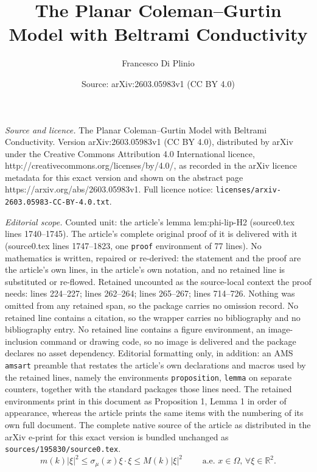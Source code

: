 \documentclass[10pt,a4paper]{amsart}
\title{The Planar Coleman--Gurtin Model with Beltrami Conductivity}
\author{Francesco Di Plinio}
\date{Source: arXiv:2603.05983v1 (CC BY 4.0)}
\begin{document}
\maketitle

\noindent\emph{Source and licence.} The Planar Coleman--Gurtin Model with Beltrami Conductivity. Version arXiv:2603.05983v1 (CC BY 4.0), distributed by arXiv under the Creative Commons Attribution 4.0 International licence, http://creativecommons.org/licenses/by/4.0/, as recorded in the arXiv licence metadata for this exact version and shown on the abstract page https://arxiv.org/abs/2603.05983v1. Full licence notice: \texttt{licenses/arxiv-2603.05983-CC-BY-4.0.txt}.\par\smallskip

\noindent\textit{Editorial scope.} Counted unit: the article's lemma lem:phi-lip-H2 (source0.tex lines 1740--1745). The article's complete original proof of it is delivered with it (source0.tex lines 1747--1823, one \texttt{proof} environment of 77 lines). No mathematics is written, repaired or re-derived: the statement and the proof are the article's own lines, in the article's own notation, and no retained line is substituted or re-flowed.  Retained uncounted as the source-local context the proof needs: lines 224--227; lines 262--264; lines 265--267; lines 714--726.  Nothing was omitted from any retained span, so the package carries no omission record.  No retained line contains a citation, so the wrapper carries no bibliography and no bibliography entry.  No retained line contains a figure environment, an image-inclusion command or drawing code, so no image is delivered and the package declares no asset dependency.  Editorial formatting only, in addition: an AMS \texttt{amsart} preamble that restates the article's own declarations and macros used by the retained lines, namely the environments \texttt{proposition}, \texttt{lemma} on separate counters, together with the standard packages those lines need.  The retained environments print in this document as Proposition 1, Lemma 1 in order of appearance, whereas the article prints the same items with the numbering of its own full document.  The complete native source of the article as distributed in the arXiv e-print for this exact version is bundled unchanged as \texttt{sources/195830/source0.tex}.
\begin{equation}\label{eq:ellipticity}
m(k)|\xi|^{2}\le \sigma_\mu(x)\xi\cdot\xi\le M(k)|\xi|^{2}
\qquad\text{ a.e. }x\in\Omega,\, \forall \xi\in\mathbb R^{2}.
\end{equation}
\end{document}
